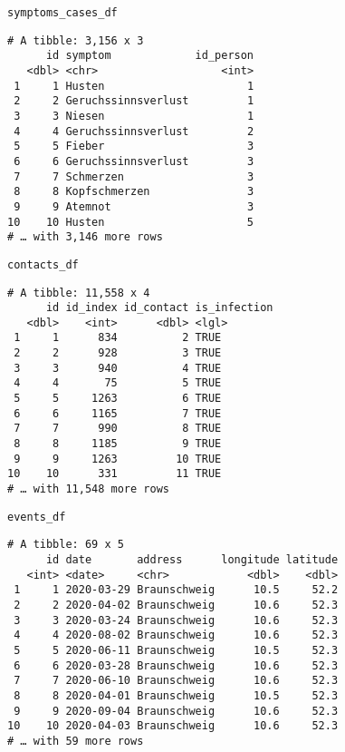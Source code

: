 \documentclass[
  8pt,
  ignorenonframetext,
]{beamer}
\begin{document}
\begin{frame}[fragile]
\texttt{symptoms\_cases\_df}

\vspace{0.2cm}

\tiny

\begin{verbatim}
# A tibble: 3,156 x 3
      id symptom             id_person
   <dbl> <chr>                   <int>
 1     1 Husten                      1
 2     2 Geruchssinnsverlust         1
 3     3 Niesen                      1
 4     4 Geruchssinnsverlust         2
 5     5 Fieber                      3
 6     6 Geruchssinnsverlust         3
 7     7 Schmerzen                   3
 8     8 Kopfschmerzen               3
 9     9 Atemnot                     3
10    10 Husten                      5
# … with 3,146 more rows
\end{verbatim}

\normalsize
\end{frame}

\begin{frame}[fragile]
\texttt{contacts\_df}

\vspace{0.2cm}

\tiny

\begin{verbatim}
# A tibble: 11,558 x 4
      id id_index id_contact is_infection
   <dbl>    <int>      <dbl> <lgl>       
 1     1      834          2 TRUE        
 2     2      928          3 TRUE        
 3     3      940          4 TRUE        
 4     4       75          5 TRUE        
 5     5     1263          6 TRUE        
 6     6     1165          7 TRUE        
 7     7      990          8 TRUE        
 8     8     1185          9 TRUE        
 9     9     1263         10 TRUE        
10    10      331         11 TRUE        
# … with 11,548 more rows
\end{verbatim}

\normalsize
\end{frame}

\begin{frame}[fragile]
\texttt{events\_df}

\vspace{0.2cm}

\tiny

\begin{verbatim}
# A tibble: 69 x 5
      id date       address      longitude latitude
   <int> <date>     <chr>            <dbl>    <dbl>
 1     1 2020-03-29 Braunschweig      10.5     52.2
 2     2 2020-04-02 Braunschweig      10.6     52.3
 3     3 2020-03-24 Braunschweig      10.6     52.3
 4     4 2020-08-02 Braunschweig      10.6     52.3
 5     5 2020-06-11 Braunschweig      10.5     52.3
 6     6 2020-03-28 Braunschweig      10.6     52.3
 7     7 2020-06-10 Braunschweig      10.6     52.3
 8     8 2020-04-01 Braunschweig      10.5     52.3
 9     9 2020-09-04 Braunschweig      10.6     52.3
10    10 2020-04-03 Braunschweig      10.6     52.3
# … with 59 more rows
\end{verbatim}

\normalsize
\end{frame}
\end{document}
